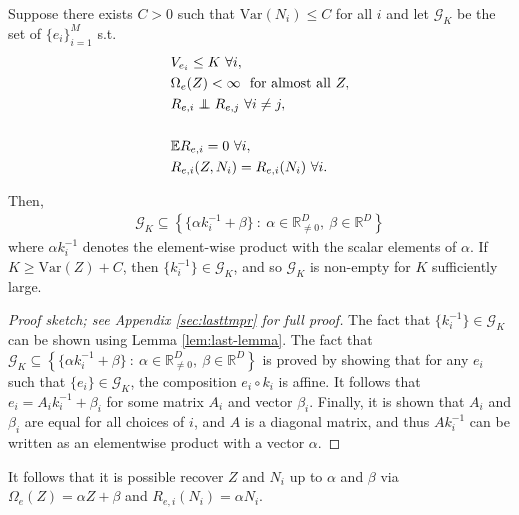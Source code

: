 \medskip

\begin{theorem}
	\label{thm:lastthm}
	Suppose there exists $C>0$ such that $\text{Var}(N_i) \leq C$ for all $i$ and let $\mathcal{G}_K$ be the set of $\{{e}_i \}_{i=1}^M$ s.t.
	\begin{align}
	& V_{{e}_i} \leq K \ \forall i, \label{eq:resid_1}\\
	& \Omega_{{e}}(Z) < \infty \  \text{ for almost all } Z, \label{eq:resid_2}\\
	&R_{{e}, i} \independent R_{{e}, j} \ \forall i \not= j, \label{eq:resid_3}\\
	\nonumber \\    &\mathbb{E} R_{{e}, i} = 0 \ \forall i, \label{eq:resid_5} \\
	&R_{{e}, i}(Z, N_i) = R_{{e}, i}(N_i) \ \forall i. \label{eq:resid_6}
	\end{align}
	
	Then,
	\begin{align*}
	\mathcal{G}_K \subseteq\left\lbrace \{ {\alpha} {k}^{-1}_i + {\beta} \} \ : \ {\alpha} \in \mathbb{R}^{D}_{\not=0}, \: {\beta} \in \mathbb{R}^{D} \right\rbrace
	\end{align*}
	where $\alpha {k}^{-1}_i$ denotes the element-wise product with the scalar elements of ${\alpha}$.
	If $K \geq \text{Var}(Z) + C$, then $ \{ {k}^{-1}_i \}  \in \mathcal{G}_K$,
	and so $\mathcal{G}_K$ is non-empty for $K$ sufficiently large.
\end{theorem}
\begin{proof}[Proof sketch; see Appendix \ref{sec:lasttmpr} for full proof]
The fact that $\{ {k}^{-1}_i \}  \in \mathcal{G}_K$ can be shown using Lemma \ref{lem:last-lemma}. 
The fact that $\mathcal{G}_K \subseteq\left\lbrace \{ {\alpha} {k}^{-1}_i + {\beta} \} \ : \ {\alpha} \in \mathbb{R}^{D}_{\not=0}, \: {\beta} \in \mathbb{R}^{D} \right\rbrace$ is proved by showing that for any $e_i$ such that $\{e_i\} \in \mathcal{G}_K$, the composition $e_i \circ k_i$ is affine.
It follows that $e_i = A_i k_i^{-1} + \beta_i$ for some matrix $A_i$ and vector $\beta_i$. 
Finally, it is shown that $A_i$ and $\beta_i$ are equal for all choices of $i$, and $A$ is a diagonal matrix, and thus $A k_i^{-1}$ can be written as an elementwise product with a vector $\alpha$.
\end{proof}

It follows that it is possible recover $Z$ and $N_i$ up to ${\alpha}$ and ${\beta}$ via $\Omega_e(Z) = {\alpha}Z + {\beta}$ and $R_{{e}, i}(N_i) = {\alpha}N_i$.

